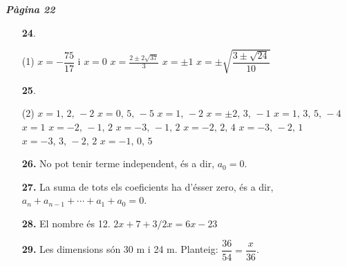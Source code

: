 \documentclass[a4paper, pdf, twoside]{book}
\begin{document}
\begin{multicols}{2}

{\textbf{\em Pàgina 22}} \hrulefill
\begin{enumerate}
\vspace{0.25cm}



 \item[\fontfamily{phv}\selectfont\color{blue}\textbf{24}. ] 
 \begin{tasks}[column-sep=1em, item-indent=1.3333em](1)
	 \task $x=-\dfrac {75}{17}$ i $x=0$
	 \task* $x=\frac {2\pm 2\sqrt {37}}{3}$
	 \task $x=\pm 1$
	 \task* $x=\pm \sqrt {\dfrac {3\pm \sqrt {24}}{10}}$
\end{tasks}
 \end{enumerate}
\begin{enumerate}
\vspace{0.25cm}



 \item[\fontfamily{phv}\selectfont\color{blue}\textbf{25}. ]  \scalebox{0.6}{\simbolclau } 
 \begin{tasks}[column-sep=1em, item-indent=1.3333em](2)
	 \task  $x=1,\,2,\,-2$
	 \task $x=0,\,5,\,-5$
	 \task $x=1,\,-2$
	 \task $x=\pm 2,\,3,\,-1$
	 \task $x=1,\,3,\,5,\,-4$
	 \task $x=1$
	 \task $x=-2,\,-1,\,2$
	 \task $x=-3,\,-1,\,2$
	 \task $x=-2,\,2,\,4$
	 \task $x=-3,\,-2,\,1$
	 \task $x=-3,\,3,\,-2,\,2$
	 \task $x=-1,\,0,\,5$ 
\end{tasks}
\vspace{0.25cm}
\item[\fontfamily{phv}\selectfont\color{blue}\textbf{26. }] 
No pot tenir terme independent, és a dir, $a_0=0$.
\vspace{0.25cm}
\item[\fontfamily{phv}\selectfont\color{blue}\textbf{27. }] 
La suma de tots els coeficients ha d'ésser zero, és a dir, $a_n + a_{n-1}+\cdots +a_1+a_0=0$.
\vspace{0.25cm}
\item[\fontfamily{phv}\selectfont\color{blue}\textbf{28. }] 
El nombre és 12. $2x+7+3/2x=6x-23$
\vspace{0.25cm}
\item[\fontfamily{phv}\selectfont\color{blue}\textbf{29. }] 
Les dimensions són 30 m i 24 m. Planteig: $\dfrac {36}{54}=\dfrac {x}{36}$. 
\vspace{0.25cm}




\end{enumerate}
\end{multicols}
\end{document}
